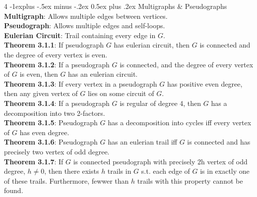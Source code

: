 \documentclass[letterpaper, 8pt]{extarticle}
\makeatletter
\renewcommand{\section}{\@startsection{section}{1}{0mm}%
	{-1explus -.5ex minus -.2ex}%
	{0.5ex plus .2ex}%
	{\normalfont\normalsize\bfseries}}
\makeatother
\begin{document}
\begin{multicols*}{4}
	\section{Multigraphs \& Pseudographs}
	\textbf{Multigraph}: Allows multiple edges between vertices. \\
	\textbf{Pseudograph}: Allows multiple edges and self-loops. \\
	\textbf{Eulerian Circuit}: Trail containing every edge in $G$. \\
	\textbf{Theorem 3.1.1}: If pseudograph $G$ has eulerian circuit, then $G$ is connected and the degree of every vertex is even. \\
	\textbf{Theorem 3.1.2}: If a pseudograph $G$ is connected, and the degree of every vertex of $G$ is even, then $G$ has an eulerian circuit. \\
	\textbf{Theorem 3.1.3}: If every vertex in a pseudograph $G$ has positive even degree, then any given vertex of $G$ lies on some circuit of $G$. \\
	\textbf{Theorem 3.1.4}: If a pseudograph $G$ is regular of degree 4, then $G$ has a decomposition into two 2-factors. \\
	\textbf{Theorem 3.1.5}: Pseudograph $G$ has a decomposition into cycles iff every vertex of $G$ has even degree. \\
	\textbf{Theorem 3.1.6}: Pseudograph $G$ has an eulerian trail iff $G$ is connected and has precisely two vertex of odd degree. \\
	\textbf{Theorem 3.1.7}: If $G$ is connected pseudograph with precisely 2h vertex of odd degree, $h \ne 0$, then there exists $h$ trails in $G$ s.t. each edge of $G$ is in exactly one of these trails. Furthermore, fewwer than $h$ trails with this property cannot be found. \\


\end{multicols*}
\end{document}
